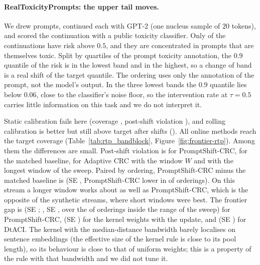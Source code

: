 \paragraph{RealToxicityPrompts: the upper tail moves.}
We drew \RtpN{} prompts, continued each with GPT-2 (one nucleus sample of $20$ tokens), and scored the continuation with a public toxicity classifier. Only \RtpFracHigh{} of the continuations have risk above $0.5$, and they are concentrated in prompts that are themselves toxic. Split by quartiles of the prompt toxicity annotation, the $0.9$ quantile of the risk is \RtpQnineLo{} in the lowest band and \RtpQnineHi{} in the highest, so a change of band is a real shift of the target quantile. The ordering uses only the annotation of the prompt, not the model's output. In the three lowest bands the $0.9$ quantile lies below $0.06$, close to the classifier's noise floor, so the intervention rate at $\tau=0.5$ carries little information on this task and we do not interpret it.

Static calibration fails here (coverage \RtpStaticCov{}, post-shift violation \RtpStaticPost{}), and rolling calibration is better but still above target after shifts (\RtpRollingPost{}). All online methods reach the target coverage (Table~\ref{tab:rtp_bandblock}, Figure~\ref{fig:frontier-rtp}). Among them the differences are small. Post-shift violation is \RtpPSPost{} for PromptShift-CRC, \RtpMatchedPost{} for the matched baseline, \RtpAdaptWPost{} for Adaptive CRC with the window $W$ and \RtpAdaptLongPost{} with the longest window of the sweep. Paired by ordering, PromptShift-CRC minus the matched baseline is \RtpPSvsMatchedPost{} (SE \RtpPSvsMatchedPostSE{}, PromptShift-CRC lower in \RtpPSvsMatchedPostLower{} of \RtpPSvsMatchedPostN{} orderings). On this stream a longer window works about as well as PromptShift-CRC, which is the opposite of the synthetic streams, where short windows were best. The frontier gap is \RtpFrontierPS{} (SE \RtpFrontierPSSE{}; \RtpFrontierPSIn{}, SE \RtpFrontierPSInSE{}, over the \RtpFrontierPSInN{} of \RtpFrontierPSAllN{} orderings inside the range of the sweep) for PromptShift-CRC, \RtpFrontierKernelUpd{} (SE \RtpFrontierKernelUpdSE{}) for the kernel weights with the update, and \RtpFrontierDtACI{} (SE \RtpFrontierDtACISE{}) for DtACI. The kernel with the median-distance bandwidth barely localises on sentence embeddings (the effective size of the kernel rule is close to its pool length), so its behaviour is close to that of uniform weights; this is a property of the rule with that bandwidth and we did not tune it.

